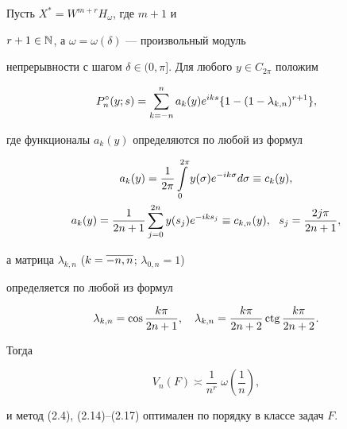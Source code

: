 \begin{cornonum}


Пусть $X^* = W^{m+r}H_\omega$, где $m+1$ и


$r+1\in \Bbb {N}$, а $\omega = \omega(\delta)$ --- произвольный модуль


непрерывности с шагом $\delta \in (0,\pi]$. Для любого $y\in


C_{2\pi}$ положим


\begin{equation}


P_n^\circ(y;s) = \suml_{k=-n}^n a_k(y)e^{iks}\{1-(1-


\lambda_{k,n})^{r+1}\},


\end{equation}


где функционалы $a_k(y)$ определяются по любой из формул


\begin{gather}


a_k(y) = \frac{1}{2\pi}\intl_0^{2\pi} y(\sigma)e^{-


ik\sigma}d\sigma \equiv c_k(y), \\


%


a_k(y) = \frac{1}{2n+1}\suml_{j=0}^{2n} y(s_j)e^{-iks_j} \equiv


c_{k,n}(y),\ \ s_j=\frac{2j\pi}{2n+1},


\end{gather}


а матрица $\lambda_{k,n}$ ($k=\overline{-n,n}$; $\lambda_{0,n}=1$)


определяется по любой из формул


\begin{equation}


\lambda_{k,n} = \cos\frac{k\pi}{2n+1},\quad \lambda_{k,n} =


\frac{k\pi}{2n+2}\ctg\frac{k\pi}{2n+2}.


\end{equation}





Тогда


\begin{equation}


V_n(F) \asymp \frac{1}{n^r}\;\omega\left(\frac{1}{n}\right),


\end{equation}


и метод (2.4), (2.14)--(2.17) оптимален по порядку в классе задач $F$.


\end{cornonum}





